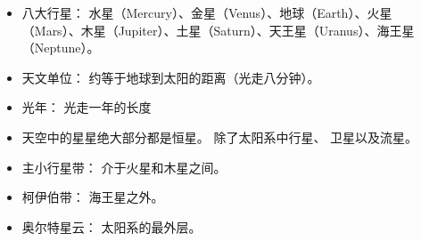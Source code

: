 
\begin{issues}
\issueDraft
\end{issues}

\begin{itemize}
\item 八大行星： 水星（Mercury）、金星（Venus）、地球（Earth）、火星（Mars）、木星（Jupiter）、土星（Saturn）、天王星（Uranus）、海王星（Neptune）。
\item 天文单位： 约等于地球到太阳的距离（光走八分钟）。
\item 光年： 光走一年的长度
\item 天空中的星星绝大部分都是恒星。 除了太阳系中行星、 卫星以及流星。
\item 主小行星带： 介于火星和木星之间。
\item 柯伊伯带： 海王星之外。
\item 奥尔特星云： 太阳系的最外层。
\end{itemize}
